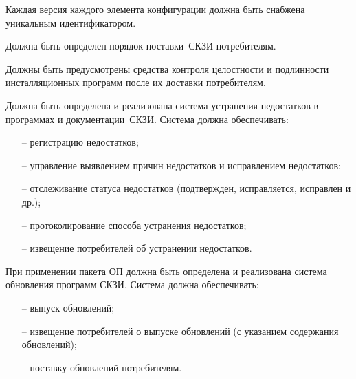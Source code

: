 \label{R.LC.CMVersion} %
Каждая версия каждого элемента конфигурации 
должна быть снабжена уникальным идентификатором. 

\label{R.LC.Delivery} %
Должна быть определен порядок поставки~СКЗИ потребителям.  

\label{R.LC.Authenticode} %
Должны быть предусмотрены средства контроля целостности и подлинности 
инсталляционных программ после их доставки потребителям. 

\label{R.LC.FlawRemediation} %
Должна быть определена и реализована система устранения недостатков в программах
и документации~СКЗИ.
%
Система должна обеспечивать:
\begin{itemize}
\item[--]
регистрацию недостатков;
\item[--]
управление выявлением причин недостатков и исправлением недостатков;
\item[--]
отслеживание статуса недостатков 
(подтвержден, исправляется, исправлен и др.);
\item[--]
протоколирование способа устранения недостатков;
\item[--]
извещение потребителей об устранении недостатков.
\end{itemize}

\label{R.LC.SU} %
При применении пакета ОП должна быть определена и реализована система 
обновления программ СКЗИ. 
%
Система должна обеспечивать:
\begin{itemize}
\item[--]
выпуск обновлений;
\item[--]
извещение потребителей о выпуске обновлений (с указанием содержания 
обновлений);  
\item[--]
поставку обновлений потребителям.
\end{itemize}

